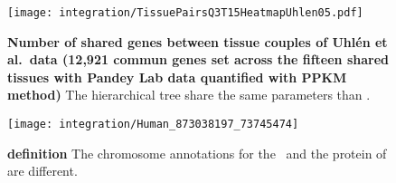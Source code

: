 \begin{figure}[!htb]
    \texttt{[image: integration/TissuePairsQ3T15HeatmapUhlen05.pdf]}\centering
    \vspace{-8mm}
    \caption[Number of shared genes between tissue couples of Pandey (12,921 genes)]{%
    \label{fig:heatmapUhlenTissuePairs05}\textbf{Number of shared genes
    between tissue couples of Uhlén et al.\ data (12,921 commun genes set
    across the fifteen shared tissues with Pandey Lab data quantified
    with PPKM method)} The
    hierarchical tree share the same parameters than .}
\end{figure}








\normalsize


\pagestyle{scrheadings}

\begin{sidewaysfigure}
    \texttt{[image: integration/Human\_873038197\_73745474]}\centering
    \caption[STAU2 definition]{\label{fig:stau2def}\textbf{ definition}
    The chromosome annotations for the \mRNA\ and the protein of 
    are different.}
\end{sidewaysfigure}

